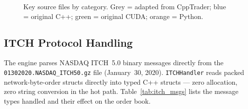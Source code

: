 \documentclass[12pt]{article}
\begin{document}
\begin{figure}[H]
\caption{Key source files by category. Grey = adapted from CppTrader;
  blue = original C++; green = original CUDA; orange = Python.}
\label{fig:source_tree}
\end{figure}

\subsection{ITCH Protocol Handling}

The engine parses NASDAQ ITCH~5.0 binary messages directly from the
\texttt{01302020.NASDAQ\_ITCH50.gz} file (January~30, 2020).
\texttt{ITCHHandler} reads packed network-byte-order structs directly
into typed C++ structs --- zero allocation, zero string conversion in
the hot path.
Table~\ref{tab:itch_msgs} lists the message types handled and their
effect on the order book.
\end{document}
